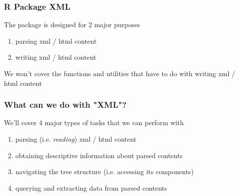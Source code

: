 \documentclass[12pt]{beamer}\usepackage[]{graphicx}\usepackage[]{color}
\begin{document}

\begin{frame}
\begin{center}
\Huge{}
\end{center}
\end{frame}


\begin{frame}
\frametitle{R Package XML}

The package  is designed for 2 major purposes
\begin{enumerate}
 \item parsing xml / html content
 \item writing xml / html content
\end{enumerate}

\bigskip

We won't cover the functions and utilities that have to do with writing xml / html content

\end{frame}


\begin{frame}
\frametitle{What can we do with "XML"?}

We'll cover 4 major types of tasks that we can perform with 
\begin{enumerate}
 \item parsing (i.e. \textit{reading}) xml / html content
 \item obtaining descriptive information about parsed contents
 \item navigating the tree structure (i.e. accessing its components)
 \item querying and extracting data from parsed contents
\end{enumerate}

\end{frame}

\end{document}
